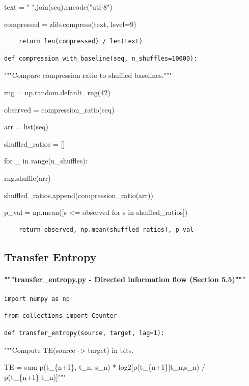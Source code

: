 \documentclass[11pt,letterpaper]{article}
\begin{document}
    text = " ".join(seq).encode("utf-8")


    compressed = zlib.compress(text, level=9)

\begin{lstlisting}
    return len(compressed) / len(text)
\end{lstlisting}
\begin{lstlisting}
def compression_with_baseline(seq, n_shuffles=10000):
\end{lstlisting}

    """Compare compression ratio to shuffled baselines."""


    rng = np.random.default\_rng(42)


    observed = compression\_ratio(seq)


    arr = list(seq)


    shuffled\_ratios = []


    for \_ in range(n\_shuffles):


        rng.shuffle(arr)


        shuffled\_ratios.append(compression\_ratio(arr))


    p\_val = np.mean([s <= observed for s in shuffled\_ratios])

\begin{lstlisting}
    return observed, np.mean(shuffled_ratios), p_val
\end{lstlisting}

\subsection{Transfer Entropy}

\paragraph{"""transfer\_entropy.py - Directed information flow (Section 5.5)"""}

\begin{lstlisting}
import numpy as np
\end{lstlisting}
\begin{lstlisting}
from collections import Counter
\end{lstlisting}
\begin{lstlisting}
def transfer_entropy(source, target, lag=1):
\end{lstlisting}

    """Compute TE(source -> target) in bits.


    TE = sum p(t\_\{n+1\}, t\_n, s\_n) * log2[p(t\_\{n+1\}|t\_n,s\_n) / p(t\_\{n+1\}|t\_n)]"""
\end{document}
